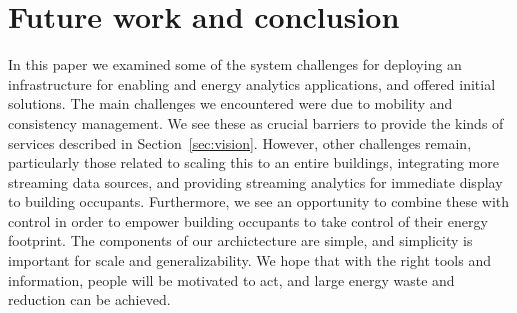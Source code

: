 \section{Future work and conclusion}
In this paper we examined some of the system challenges for deploying an infrastructure for enabling and energy analytics applications, 
and offered initial solutions.  The main challenges we encountered were due to mobility and consistency management.  We
see these as crucial barriers to provide the kinds of services described in Section~\ref{sec:vision}.
However, other challenges remain, particularly those related to scaling this to an entire buildings, integrating
more streaming data sources, and providing streaming analytics for immediate display to building occupants.
Furthermore, we see an opportunity to combine these with control in order to empower building occupants to take
control of their energy footprint.  The components of our archictecture are simple, and simplicity is important for scale and
generalizability.  We hope that with the right tools and information, people will be motivated to act, and large
energy waste and reduction can be achieved.